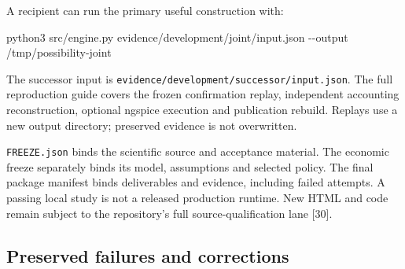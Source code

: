\documentclass[
  11pt,
]{article}
\newenvironment{Shaded}{}{}
\newcommand{\AttributeTok}[1]{\textcolor[rgb]{0.49,0.56,0.16}{#1}}
\newcommand{\ExtensionTok}[1]{#1}
\newcommand{\NormalTok}[1]{#1}
\begin{document}
A recipient can run the primary useful construction with:

\begin{Shaded}
\begin{Highlighting}[]
\ExtensionTok{python3}\NormalTok{ src/engine.py evidence/development/joint/input.json }\AttributeTok{{-}{-}output}\NormalTok{ /tmp/possibility{-}joint}
\end{Highlighting}
\end{Shaded}

The successor input is
\texttt{evidence/development/successor/input.json}. The full
reproduction guide covers the frozen confirmation replay, independent
accounting reconstruction, optional ngspice execution and publication
rebuild. Replays use a new output directory; preserved evidence is not
overwritten.

\texttt{FREEZE.json} binds the scientific source and acceptance
material. The economic freeze separately binds its model, assumptions
and selected policy. The final package manifest binds deliverables and
evidence, including failed attempts. A passing local study is not a
released production runtime. New HTML and code remain subject to the
repository's full source-qualification lane {[}30{]}.

\hypertarget{preserved-failures-and-corrections}{%
\subsection{Preserved failures and
corrections}\label{preserved-failures-and-corrections}}
\end{document}
